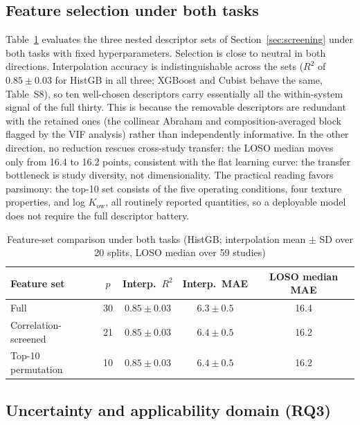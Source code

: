 \subsection{Feature selection under both tasks}
\label{sec:fs}

Table~\ref{tab:fs} evaluates the three nested descriptor sets of
Section~\ref{sec:screening} under both tasks with fixed
hyperparameters. Selection is close to neutral in both directions.
Interpolation accuracy is indistinguishable across the sets ($R^2$ of
$0.85 \pm 0.03$ for HistGB in all three; XGBoost and Cubist behave the
same, Table~S8), so ten well-chosen descriptors carry essentially all
the within-system signal of the full thirty. This is because the
removable descriptors are redundant with the retained ones (the
collinear Abraham and composition-averaged block flagged by the VIF
analysis) rather than independently informative. In the other
direction, no reduction rescues cross-study transfer: the LOSO median
moves only from 16.4 to 16.2 points, consistent with the flat learning
curve: the transfer bottleneck is study diversity, not dimensionality.
The practical reading favors parsimony: the top-10 set consists of the
five operating conditions, four texture properties, and log
$K_{\mathrm{ow}}$, all routinely reported quantities, so a deployable
model does not require the full descriptor battery.

\begin{table}[t]
\centering
\caption{Feature-set comparison under both tasks (HistGB; interpolation
mean $\pm$ SD over 20 splits, LOSO median over 59 studies)}
\label{tab:fs}
\begin{tabular}{lcccc}
\toprule
Feature set & $p$ & Interp.\ $R^2$ & Interp.\ MAE & LOSO median MAE \\
\midrule
Full & 30 & $0.85 \pm 0.03$ & $6.3 \pm 0.5$ & 16.4 \\
Correlation-screened & 21 & $0.85 \pm 0.03$ & $6.4 \pm 0.5$ & 16.2 \\
Top-10 permutation & 10 & $0.85 \pm 0.03$ & $6.4 \pm 0.5$ & 16.2 \\
\bottomrule
\end{tabular}
\end{table}

\subsection{Uncertainty and applicability domain (RQ3)}
\label{sec:rq3}

